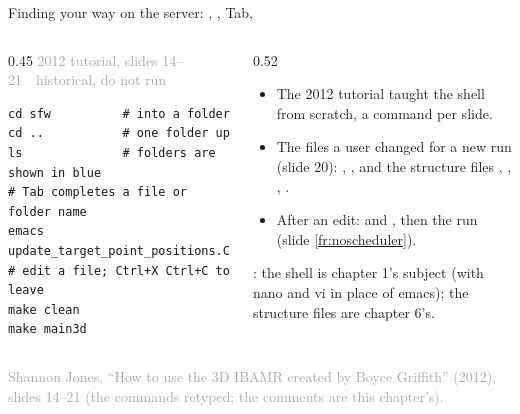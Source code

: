 \documentclass[aspectratio=169,11pt]{beamer}
\newcommand{\sourcecredit}[1]{\vfill\begin{flushright}\tiny\textcolor{DarkGray}{#1}\end{flushright}}
\newcommand{\hist}[1]{{\tiny\sffamily\textcolor{DarkGray}{#1\ \textbullet\ historical, do not run}}\par\nointerlineskip\vspace{0.3mm}}
\begin{document}
\begin{frame}[fragile]{Finding your way on the server: , , Tab, }
\label{fr:shell2012}
\begin{columns}[T,onlytextwidth]
\begin{column}{0.45\textwidth}
\hist{2012 tutorial, slides 14--21}
\begin{lstlisting}[style=hist]
cd sfw          # into a folder
cd ..           # one folder up
ls              # folders are shown in blue
# Tab completes a file or folder name
emacs update_target_point_positions.C   # edit a file; Ctrl+X Ctrl+C to leave
make clean
make main3d
\end{lstlisting}
\end{column}
\begin{column}{0.52\textwidth}
\small
\begin{itemize}\setlength{\itemsep}{3pt}
  \item The 2012 tutorial taught the shell from scratch, a command per slide.
  \item The files a user changed for a new run (slide 20): , , and the structure files , , , .
  \item After an edit:  and , then the run (slide \ref{fr:noscheduler}).
\end{itemize}
\vspace{1mm}
\footnotesize {}: the shell is chapter 1's subject (with nano and vi in place of emacs); the structure files are chapter 6's.
\end{column}
\end{columns}
\sourcecredit{Shannon Jones, ``How to use the 3D IBAMR created by Boyce Griffith'' (2012), slides 14--21 (the commands retyped; the comments are this chapter's).}
\end{frame}
\end{document}
